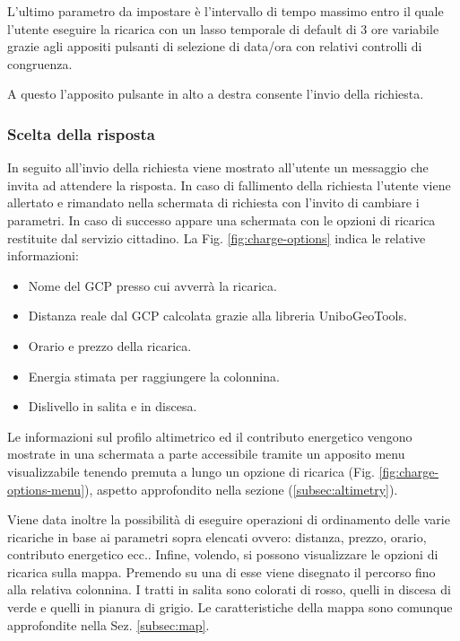 L'ultimo parametro da impostare è l'intervallo di tempo massimo entro il quale l'utente eseguire la ricarica con un lasso temporale di default di 3 ore variabile grazie agli appositi pulsanti di selezione di data/ora con relativi controlli di congruenza.

A questo l'apposito pulsante in alto a destra consente l'invio della richiesta.

\subsubsection{Scelta della risposta}

In seguito all'invio della richiesta viene mostrato all'utente un messaggio che invita ad attendere la risposta. In caso di fallimento della richiesta l'utente viene allertato e rimandato nella schermata di richiesta con l'invito di cambiare i parametri. In caso di successo appare una schermata con le opzioni di ricarica restituite dal servizio cittadino. La Fig. \ref{fig:charge-options} indica le relative informazioni:

\begin{itemize}
	\item Nome del GCP presso cui avverrà la ricarica.
	\item Distanza reale dal GCP calcolata grazie alla libreria UniboGeoTools.
	\item Orario e prezzo della ricarica.
	\item Energia stimata per raggiungere la colonnina.
	\item Dislivello in salita e in discesa.
\end{itemize}

Le informazioni sul profilo altimetrico ed il contributo energetico vengono mostrate in una schermata a parte accessibile tramite un apposito menu visualizzabile tenendo premuta a lungo un opzione di ricarica (Fig. \ref{fig:charge-options-menu}), aspetto approfondito nella sezione (\ref{subsec:altimetry}).

Viene data inoltre la possibilità di eseguire operazioni di ordinamento delle varie ricariche in base ai parametri sopra elencati ovvero: distanza, prezzo, orario, contributo energetico ecc.. Infine, volendo, si possono visualizzare le opzioni di ricarica sulla mappa. Premendo su una di esse viene disegnato il percorso fino alla relativa colonnina. I tratti in salita sono colorati di rosso, quelli in discesa di verde e quelli in pianura di grigio. Le caratteristiche della mappa sono comunque approfondite nella Sez. \ref{subsec:map}.

